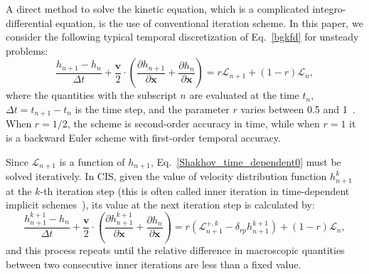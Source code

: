 \documentclass[onefignum,onetabnum]{siamart171218}
\begin{document}
A direct method to solve the kinetic equation, which is a complicated integro-differential equation, is the use of  conventional iteration scheme. In this paper, we consider the following typical temporal discretization of Eq.~\eqref{bgkfd} for unsteady problems: 
\begin{equation}\label{Shakhov_time_dependent0}
\frac{h_{n+1}-h_n}{\Delta{t}}+
\frac{\bm{v}}{2}\cdot
	\left( \frac{\partial{h_{n+1}}}{\partial\bm{x}}
	+ \frac{\partial{h_{n}}}{\partial\bm{x}}\right) =r\mathcal{L}_{n+1}+(1-r)\mathcal{L}_{n}, 
\end{equation}
where the quantities with the subscript $n$ are evaluated at the time $t_n$, $\Delta{t}=t_{n+1}-t_{n}$ is the time step, and the parameter $r$ varies between 0.5 and 1~\cite{Taitano2014,Zhu2019JCP}. When $r=1/2$, the scheme is second-order accuracy in time, while when $r=1$ it is a backward Euler scheme with first-order temporal accuracy.



Since $\mathcal{L}_{n+1}$ is a function of $h_{n+1}$, Eq.~\eqref{Shakhov_time_dependent0} must be solved iteratively. In CIS, given the value of velocity distribution function $h_{n+1}^{k}$ at the $k$-th iteration step (this is often called inner iteration in time-dependent implicit schemes~\cite{Zhu2019JCP}), its value at the next iteration step is calculated by:
\begin{equation}\label{Shakhov_time_dependent}
\frac{h^{k+1}_{n+1}-h_n}{\Delta{t}}+
\frac{\bm{v} }{2}\cdot
\left( \frac{\partial{h^{k+1}_{n+1}}}{\partial\bm{x}}
+ \frac{\partial{h_{n}}}{\partial\bm{x}}\right) =r\left({\mathcal{L}_{n+1}^{+,k}- \delta_{rp}  h_{n+1}^{k+1}}\right)
+(1-r){ \mathcal{L}_{n} },
\end{equation}
and this process repeats until the relative difference in macroscopic quantities between two consecutive inner iterations are less than a fixed value. 
\end{document}
